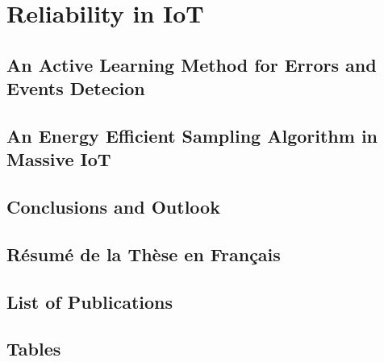 \documentclass[a4paper,10pt,twoside]{ThesisStyle}
\begin{document}
\part{Reliability in IoT}
\label{pa:part3}

\chapter{An Active Learning Method for Errors and Events Detecion} \label{ch:CABD}


\chapter{An Energy Efficient Sampling Algorithm in Massive IoT} \label{ch:smart_freq}



{}
\clearpage{}
\chapter{Conclusions and Outlook}
\label{ch:CFP}


\appendix
\chapter{R\'{e}sum\'{e} de la Th\`{e}se en Fran\c{c}ais}

\chapter{List of Publications}
\label{publication}


\chapter{Tables}
\label{tablesBig}



%
%


\printindex
\end{document}
